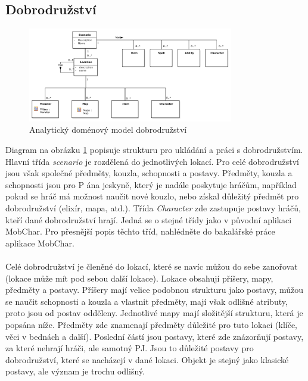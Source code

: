 \documentclass[thesis=B,czech]{resources/FITthesis}[2012/06/26]
\begin{document}
\subsection{Dobrodružství}
\begin{figure}\centering
	\includegraphics[width=0.8\textwidth]{images/domain_scenario}
	\caption[Analytický doménový model dobrodružství]{Analytický doménový model dobrodružství}\label{fig:dm_scenario}
\end{figure}
Diagram na obrázku \ref{fig:dm_scenario} popisuje strukturu pro ukládání a práci s dobrodružstvím. Hlavní třída \textit{scenario} je rozdělená do jednotlivých lokací. Pro celé dobrodružství jsou však společné předměty, kouzla, schopnosti a postavy. Předměty, kouzla a schopnosti jsou pro P	ána jeskyně, který je nadále poskytuje hráčům, například pokud se hráč má možnost naučit nové kouzlo, nebo získal důležitý předmět pro dobrodružství (elixír, mapa, atd.). Třída \textit{Character} zde zastupuje postavy hráčů, kteří dané dobrodružství hrají. Jedná se o stejné třídy jako v původní aplikaci MobChar. Pro přesnější popis těchto tříd, nahlédněte do bakalářské práce aplikace MobChar.\\
\\
Celé dobrodružství je členěné do lokací, které se navíc můžou do sebe zanořovat (lokace může mít pod sebou další lokace). Lokace obsahují příšery, mapy, předměty a postavy. Příšery mají velice podobnou strukturu jako postavy, můžou se naučit schopnosti a kouzla a vlastnit předměty, mají však odlišné atributy, proto jsou od postav odděleny. Jednotlivé mapy mají složitější strukturu, která je popsána níže. Předměty zde znamenají předměty důležité pro tuto lokaci (klíče, věci v bednách a další). Poslední částí jsou postavy, které zde znázorňují postavy, za které nehrají hráči, ale samotný PJ. Jsou to důležité postavy pro dobrodružství, které se nacházejí v dané lokaci. Objekt je stejný jako klasické postavy, ale význam je trochu odlišný.
\end{document}
